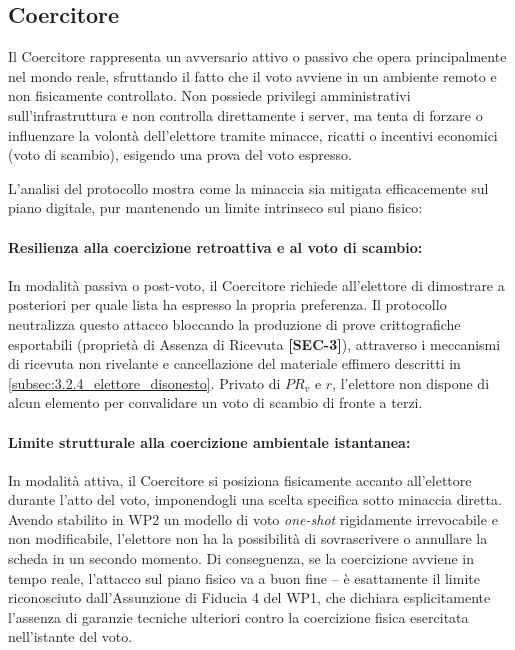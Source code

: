 \subsection{Coercitore}
\label{subsec:3.2.5_coercitore}

Il Coercitore rappresenta un avversario attivo o passivo che opera principalmente nel mondo reale, sfruttando il fatto che il voto avviene in un ambiente remoto e non fisicamente controllato. Non possiede privilegi amministrativi sull'infrastruttura e non controlla direttamente i server, ma tenta di forzare o influenzare la volontà dell'elettore tramite minacce, ricatti o incentivi economici (voto di scambio), esigendo una prova del voto espresso.

L'analisi del protocollo mostra come la minaccia sia mitigata efficacemente sul piano digitale, pur mantenendo un limite intrinseco sul piano fisico:

\paragraph{Resilienza alla coercizione retroattiva e al voto di scambio:} In modalità passiva o post-voto, il Coercitore richiede all'elettore di dimostrare a posteriori per quale lista ha espresso la propria preferenza. Il protocollo neutralizza questo attacco bloccando la produzione di prove crittografiche esportabili (proprietà di Assenza di Ricevuta \textbf{[SEC-3]}), attraverso i meccanismi di ricevuta non rivelante e cancellazione del materiale effimero descritti in \ref{subsec:3.2.4_elettore_disonesto}. Privato di $PR_v$ e $r$, l'elettore non dispone di alcun elemento per convalidare un voto di scambio di fronte a terzi.

\paragraph{Limite strutturale alla coercizione ambientale istantanea:} In modalità attiva, il Coercitore si posiziona fisicamente accanto all'elettore durante l'atto del voto, imponendogli una scelta specifica sotto minaccia diretta. Avendo stabilito in WP2 un modello di voto \textit{one-shot} rigidamente irrevocabile e non modificabile, l'elettore non ha la possibilità di sovrascrivere o annullare la scheda in un secondo momento. Di conseguenza, se la coercizione avviene in tempo reale, l'attacco sul piano fisico va a buon fine -- è esattamente il limite riconosciuto dall'Assunzione di Fiducia 4 del WP1, che dichiara esplicitamente l'assenza di garanzie tecniche ulteriori contro la coercizione fisica esercitata nell'istante del voto.

